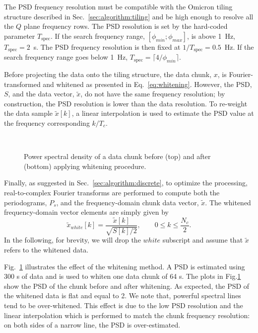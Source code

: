 The PSD frequency resolution must be compatible with the Omicron tiling structure described in Sec.~\ref{sec:algorithm:tiling} and be high enough to resolve all the $Q$ plane frequency rows. The PSD resolution is set by the hard-coded parameter $T_\mathrm{spec}$. If the search frequency range, $[\phi_{min}; \phi_{max}]$, is above 1~Hz, $T_\mathrm{spec}=2$~s. The PSD frequency resolution is then fixed at $1/T_\mathrm{spec}=0.5$~Hz. If the search frequency range goes below 1~Hz, $T_\mathrm{spec}=\lceil4/\phi_{min}\rceil$.

Before projecting the data onto the tiling structure, the data chunk, $x$, is Fourier-transformed and whitened as presented in Eq.~\ref{eq:whitening}. However, the PSD, $S$, and the data vector, $\tilde{x}$, do not have the same frequency resolution; by construction, the PSD resolution is lower than the data resolution.  To re-weight the data sample $\tilde{x}[k]$, a linear interpolation is used to estimate the PSD value at the frequency corresponding $k/T_c$.
\begin{figure}
  \center
   \\
  \caption{Power spectral density of a data chunk before (top) and after (bottom) applying whitening procedure.}
  \label{fig:white}
\end{figure}

Finally, as suggested in Sec.~\ref{sec:algorithm:discrete}, to optimize the processing, real-to-complex Fourier transforms are performed to compute both the periodograms, $P_s$, and the frequency-domain chunk data vector, $\tilde{x}$. The whitened frequency-domain vector elements are simply given by
\begin{equation}
  \tilde{x}_{white}[k] = \frac{\tilde{x}[k]}{\sqrt{S[k]/2}}, \qquad 0 \le k \le \frac{N_c}{2}.
\end{equation}
In the following, for brevity, we will drop the $white$ subscript and assume that $\tilde{x}$ refers to the whitened data.

Fig.~\ref{fig:white} illustrates the effect of the whitening method. A PSD is estimated using 300 s of data and is used to whiten one data chunk of 64 s. The plots in Fig.\ref{fig:white} show the PSD of the chunk before and after whitening. As expected, the PSD of the whitened data is flat and equal to 2. We note that, powerful spectral lines tend to be over-whitened. This effect is due to the low PSD resolution and the linear interpolation which is performed to match the chunk frequency resolution: on both sides of a narrow line, the PSD is over-estimated.


